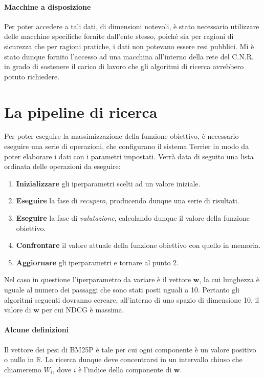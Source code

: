 \paragraph{Macchine a disposizione}
Per poter accedere a tali dati, di dimensioni notevoli, è stato necessario utilizzare
delle macchine specifiche fornite dall'ente stesso, poiché sia per ragioni di sicurezza
che per ragioni pratiche, i dati non potevano essere resi pubblici.
Mi è stato dunque fornito l'accesso ad una macchina 
all'interno della rete del C.N.R. in grado di sostenere il carico
di lavoro che gli algoritmi di ricerca avrebbero potuto richiedere.

\section{La pipeline di ricerca}
Per poter eseguire la massimizzazione della funzione obiettivo,
è necessario eseguire una serie di operazioni, che configurano il sistema Terrier
in modo da poter elaborare i dati con i parametri impostati.
Verrà data di seguito una lista ordinata delle operazioni da eseguire:

\begin{enumerate}
	\item \textbf{Inizializzare} gli iperparametri scelti ad un valore iniziale.
	\item \textbf{Eseguire} la fase di \textit{recupero}, producendo dunque una serie di risultati.
	\item \textbf{Eseguire} la fase di \textit{valutazione}, calcolando dunque il valore della funzione obiettivo.
	\item \textbf{Confrontare} il valore attuale della funzione obiettivo con quello in memoria.
	\item \textbf{Aggiornare} gli iperparametri e tornare al punto 2.
\end{enumerate}

Nel caso in questione l'iperparametro da variare è il vettore $\boldsymbol{w}$, la
cui lunghezza è uguale al numero dei passaggi che sono stati posti uguali a 10.
Pertanto gli algoritmi seguenti dovranno cercare, all'interno di uno spazio di dimensione
10, il valore di $\boldsymbol{w}$ per cui NDCG è massima.

\paragraph{Alcune definizioni}
Il vettore dei pesi di BM25P è tale per cui ogni componente è un valore
positivo o nullo in $\mathbb{R}$. La ricerca dunque deve concentrarsi
in un intervallo chiuso che chiameremo $W_i$, dove $i$ è l'indice 
della componente di $\boldsymbol{w}$.

